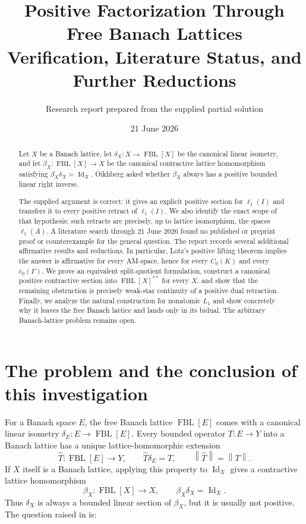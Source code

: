 \documentclass[11pt]{article}
\title{Positive Factorization Through Free Banach Lattices\\
\large Verification, Literature Status, and Further Reductions}
\author{Research report prepared from the supplied partial solution}
\date{21 June 2026}
\newcommand{\FBL}{\operatorname{FBL}}
\newcommand{\Id}{\operatorname{Id}}
\newcommand{\norm}[1]{\left\lVert #1\right\rVert}
\begin{document}
\maketitle

\begin{abstract}
Let $X$ be a Banach lattice, let $\delta_X:X\to\FBL[X]$ be the canonical
linear isometry, and let $\beta_X:\FBL[X]\to X$ be the canonical contractive
lattice homomorphism satisfying $\beta_X\delta_X=\Id_X$.  Oikhberg asked
whether $\beta_X$ always has a positive bounded linear right inverse.

The supplied argument is correct: it gives an explicit positive section for
$\ell_1(I)$ and transfers it to every positive retract of $\ell_1(I)$.  We
also identify the exact scope of that hypothesis: such retracts are precisely,
up to lattice isomorphism, the spaces $\ell_1(A)$.  A literature search through
21 June 2026 found no published or preprint proof or counterexample for the
general question.  The report records several additional affirmative results
and reductions.  In particular, Lotz's positive lifting theorem implies the
answer is affirmative for every AM-space, hence for every $C_0(K)$ and every
$c_0(\Gamma)$.  We prove an equivalent split-quotient formulation, construct a
canonical positive contractive section into $\FBL[X]^{**}$ for every $X$, and
show that the remaining obstruction is precisely weak-star continuity of a
positive dual retraction.  Finally, we analyze the natural construction for
nonatomic $L_1$ and show concretely why it leaves the free Banach lattice and
lands only in its bidual.  The arbitrary Banach-lattice problem remains open.
\end{abstract}

\section{The problem and the conclusion of this investigation}

For a Banach space $E$, the free Banach lattice $\FBL[E]$ comes with a
canonical linear isometry $\delta_E:E\to\FBL[E]$.  Every bounded operator
$T:E\to Y$ into a Banach lattice has a unique lattice-homomorphic extension
\[
 \widehat T:\FBL[E]\longrightarrow Y,
 \qquad \widehat T\delta_E=T,
 \qquad \norm{\widehat T}=\norm T.
\]
If $X$ itself is a Banach lattice, applying this property to $\Id_X$ gives a
contractive lattice homomorphism
\[
 \beta_X:\FBL[X]\longrightarrow X,
 \qquad \beta_X\delta_X=\Id_X.
\]
Thus $\delta_X$ is always a bounded linear section of $\beta_X$, but it is
usually not positive.  The question raised in \cite[Section~3]{Oikhberg2024}
is:
\end{document}
